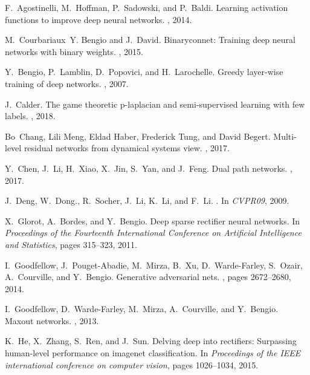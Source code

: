 \documentclass{article}
\begin{document}
\begin{thebibliography}{10}

F.~Agostinelli, M.~Hoffman, P.~Sadowski, and P.~Baldi.
\newblock Learning activation functions to improve deep neural networks.
, 2014.

M.~Courbariaux~Y. Bengio and J.~David.
\newblock Binaryconnet: Training deep neural networks with binary weights.
, 2015.

Y.~Bengio, P.~Lamblin, D.~Popovici, and H.~Larochelle.
\newblock Greedy layer-wise training of deep networks.
, 2007.

J.~Calder.
\newblock The game theoretic p-laplacian and semi-supervised learning with few
  labels.
, 2018.

Bo~Chang, Lili Meng, Eldad Haber, Frederick Tung, and David Begert.
\newblock Multi-level residual networks from dynamical systems view.
, 2017.

Y.~Chen, J.~Li, H.~Xiao, X.~Jin, S.~Yan, and J.~Feng.
\newblock Dual path networks.
, 2017.

J.~Deng, W.~Dong., R.~Socher, J.~Li, K.~Li, and F.~Li.
.
\newblock In {\em CVPR09}, 2009.

X.~Glorot, A.~Bordes, and Y.~Bengio.
\newblock Deep sparse rectifier neural networks.
\newblock In {\em Proceedings of the Fourteenth International Conference on
  Artificial Intelligence and Statistics}, pages 315--323, 2011.

I.~Goodfellow, J.~Pouget-Abadie, M.~Mirza, B.~Xu, D.~Warde-Farley, S.~Ozair,
  A.~Courville, and Y.~Bengio.
\newblock Generative adversarial nets.
, pages
  2672--2680, 2014.

I.~Goodfellow, D.~Warde-Farley, M.~Mirza, A.~Courville, and Y.~Bengio.
\newblock Maxout networks.
, 2013.

K.~He, X.~Zhang, S.~Ren, and J.~Sun.
\newblock Delving deep into rectifiers: Surpassing human-level performance on
  imagenet classification.
\newblock In {\em Proceedings of the IEEE international conference on computer
  vision}, pages 1026--1034, 2015.


\end{thebibliography}
\end{document}
